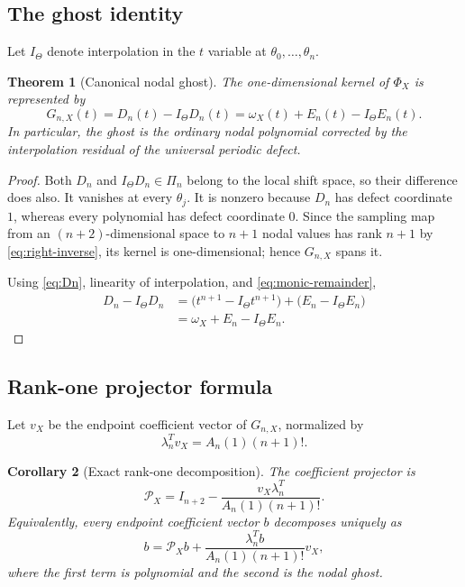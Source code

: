 \documentclass[11pt,oneside]{article}
\newtheorem{theorem}{Theorem}[section]
\newtheorem{corollary}[theorem]{Corollary}
\theoremstyle{definition}
\theoremstyle{remark}
\newcommand{\1}{\mathbf{1}}
\begin{document}
\subsection{The ghost identity}

Let $I_\Theta$ denote interpolation in the $t$ variable at
$\theta_0,\ldots,\theta_n$.

\begin{theorem}[Canonical nodal ghost]
\label{thm:ghost}
The one-dimensional kernel of $\Phi_X$ is represented by
\begin{equation}
 \boxed{
 G_{n,X}(t)=D_n(t)-I_\Theta D_n(t)
 =\omega_X(t)+E_n(t)-I_\Theta E_n(t).}
 \label{eq:ghost-identity}
\end{equation}
In particular, the ghost is the ordinary nodal polynomial corrected by the
interpolation residual of the universal periodic defect.
\end{theorem}

\begin{proof}
Both $D_n$ and $I_\Theta D_n\in\Pi_n$ belong to the local shift space, so
their difference does also.  It vanishes at every $\theta_j$.  It is nonzero
because $D_n$ has defect coordinate $1$, whereas every polynomial has defect
coordinate $0$.  Since the sampling map from an $(n+2)$-dimensional space to
$n+1$ nodal values has rank $n+1$ by \eqref{eq:right-inverse}, its kernel is
one-dimensional; hence $G_{n,X}$ spans it.

Using \eqref{eq:Dn}, linearity of interpolation, and
\eqref{eq:monic-remainder},
\begin{align*}
 D_n-I_\Theta D_n
 &=\bigl(t^{n+1}-I_\Theta t^{n+1}\bigr)
   +\bigl(E_n-I_\Theta E_n\bigr)\\
 &=\omega_X+E_n-I_\Theta E_n.
\end{align*}
\end{proof}

\subsection{Rank-one projector formula}

Let $v_X$ be the endpoint coefficient vector of $G_{n,X}$, normalized by
\begin{equation}
 \lambda_n^Tv_X=A_n(1)(n+1)!.
 \label{eq:vnorm}
\end{equation}

\begin{corollary}[Exact rank-one decomposition]
\label{cor:rank-one}
The coefficient projector is
\begin{equation}
 \boxed{
 \mathcal P_X=I_{n+2}-
 \frac{v_X\lambda_n^T}{A_n(1)(n+1)!}.}
 \label{eq:rank-one-projector}
\end{equation}
Equivalently, every endpoint coefficient vector $b$ decomposes uniquely as
\begin{equation}
 b=\mathcal P_Xb+
 \frac{\lambda_n^Tb}{A_n(1)(n+1)!}v_X,
 \label{eq:coefficient-decomp}
\end{equation}
where the first term is polynomial and the second is the nodal ghost.
\end{corollary}
\end{document}
